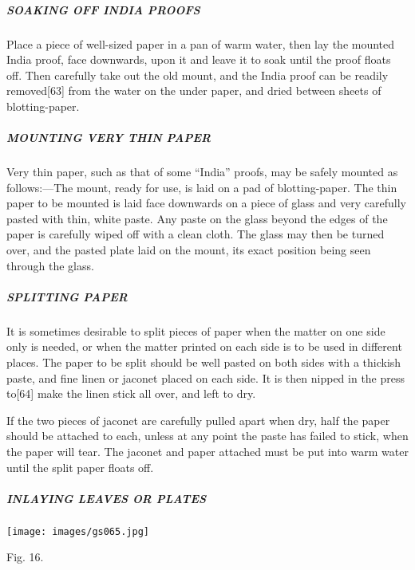 \documentclass[
]{article}
\begin{document}
\hypertarget{soaking-off-india-proofs}{%
\subparagraph{SOAKING OFF INDIA PROOFS}\label{soaking-off-india-proofs}}

Place a piece of well-sized paper in a pan of warm water, then lay the
mounted India proof, face downwards, upon it and leave it to soak until
the proof floats off. Then carefully take out the old mount, and the
India proof can be readily
removed{\protect\hypertarget{Page_63}{}{{[}63{]}}} from the water on the
under paper, and dried between sheets of blotting-paper.

\hypertarget{mounting-very-thin-paper}{%
\subparagraph{MOUNTING VERY THIN PAPER}\label{mounting-very-thin-paper}}

Very thin paper, such as that of some ``India'' proofs, may be safely
mounted as follows:---The mount, ready for use, is laid on a pad of
blotting-paper. The thin paper to be mounted is laid face downwards on a
piece of glass and very carefully pasted with thin, white paste. Any
paste on the glass beyond the edges of the paper is carefully wiped off
with a clean cloth. The glass may then be turned over, and the pasted
plate laid on the mount, its exact position being seen through the
glass.

\hypertarget{splitting-paper}{%
\subparagraph{SPLITTING PAPER}\label{splitting-paper}}

It is sometimes desirable to split pieces of paper when the matter on
one side only is needed, or when the matter printed on each side is to
be used in different places. The paper to be split should be well pasted
on both sides with a thickish paste, and fine linen or jaconet placed on
each side. It is then nipped in the press
to{\protect\hypertarget{Page_64}{}{{[}64{]}}} make the linen stick all
over, and left to dry.

If the two pieces of jaconet are carefully pulled apart when dry, half
the paper should be attached to each, unless at any point the paste has
failed to stick, when the paper will tear. The jaconet and paper
attached must be put into warm water until the split paper floats off.

\hypertarget{inlaying-leaves-or-plates}{%
\subparagraph{INLAYING LEAVES OR
PLATES}\label{inlaying-leaves-or-plates}}

\protect\hypertarget{Fig_16}{}{}
\texttt{[image: images/gs065.jpg]}

Fig. 16.
\end{document}
